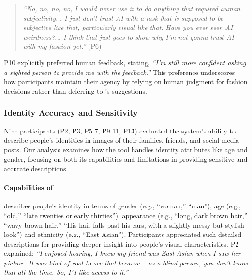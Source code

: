 \begin{quote}
    \textit{``No, no, no, no, I would never use it to do anything that required human subjectivity... I just don't trust AI with a task that is supposed to be subjective like that, particularly visual like that. Have you ever seen AI weirdness?... I think that just goes to show why I'm not gonna trust AI with my fashion yet.''} (P6)
\end{quote}


P10 explicitly preferred human feedback, stating, \textit{``I'm still more confident asking a sighted person to provide me with the feedback.''} 
This preference underscores how participants maintain their agency by relying on human judgment for fashion decisions rather than deferring to \sbma's suggestions. 







\subsubsection{Identity Accuracy and Sensitivity}
\label{identity}


Nine participants (P2, P3, P5-7, P9-11, P13) evaluated the system's ability to describe people's identities in images of their families, friends, and social media posts. 
Our analysis examines how the tool handles identity attributes like age and gender, focusing on both its capabilities and limitations in providing sensitive and accurate descriptions. 




\paragraph{Capabilities of \bma}

\sbma{} describes people's identity in terms of gender (e.g., ``woman,'' ``man''), age (e.g., ``old,'' ``late twenties or early thirties''), appearance (e.g., ``long, dark brown hair,'' ``wavy brown hair,'' ``His hair falls past his ears, with a slightly messy but stylish look'') and ethnicity (e.g., ``East Asian''). 
% 
Participants appreciated such detailed descriptions for providing deeper insight into people's visual characteristics. P2 explained: \textit{``I enjoyed hearing, I knew my friend was East Asian when I saw her picture. It was kind of cool to see that because... as a blind person, you don't know that all the time. So, I'd like access to it.''}


